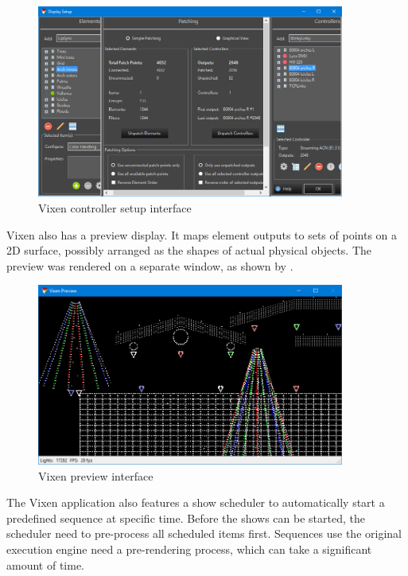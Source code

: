 \begin{figure}[!t]
  \centering
  \includegraphics[width=0.9\textwidth]{Figs//vixen_setup.png}
  \caption{\footnotesize Vixen controller setup interface}
  \label{fig:vixen-setup}
\end{figure}

Vixen also has a preview display. It maps element outputs to sets of points on a 2D surface, possibly arranged as the shapes of actual physical objects. The preview was rendered on a separate window, as shown by .

\begin{figure}[!t]
  \centering
  \includegraphics[width=0.9\textwidth]{Figs//vixen_preview.png}
  \caption{\footnotesize Vixen preview interface}
  \label{fig:vixen-preview}
\end{figure}

The Vixen application also features a show scheduler to automatically start a predefined sequence at specific time. Before the shows can be started, the scheduler need to pre-process all scheduled items first. Sequences use the original execution engine need a pre-rendering process, which can take a significant amount of time. 

